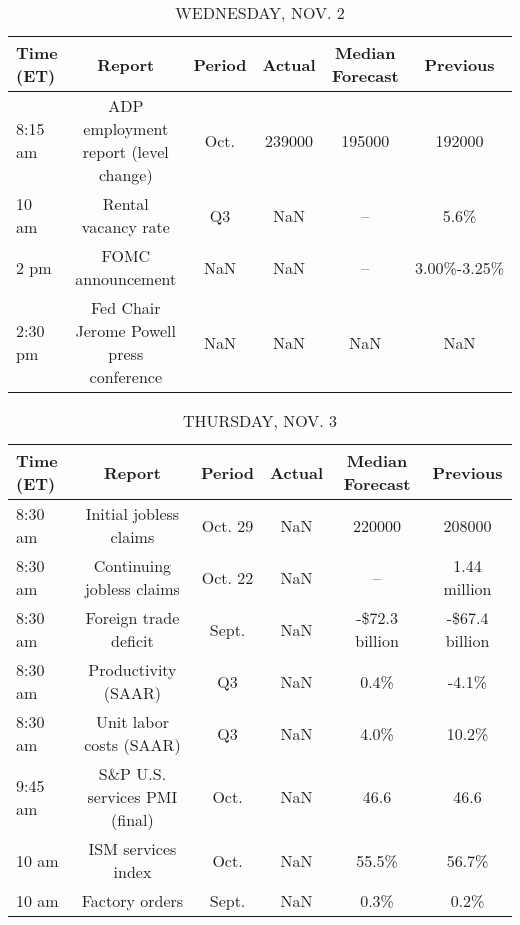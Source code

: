 \documentclass{article}%
\begin{document}
\begin{table}[htbp]%
\caption{WEDNESDAY, NOV. 2}%
\centering%
\begin{adjustbox}{width=1\textwidth}%
\begin{tabular}{lccccc}
\toprule
Time (ET) &                                   Report & Period & Actual & Median Forecast &    Previous \\
\midrule
  8:15 am &     ADP employment report (level change) &   Oct. & 239000 &          195000 &      192000 \\
    10 am &                      Rental vacancy rate &     Q3 &    NaN &              -- &        5.6\% \\
     2 pm &                        FOMC announcement &    NaN &    NaN &              -- & 3.00\%-3.25\% \\
  2:30 pm & Fed Chair Jerome Powell press conference &    NaN &    NaN &             NaN &         NaN \\
\bottomrule
\end{tabular}
%
\end{adjustbox}%
\end{table}

%


\begin{table}[htbp]%
\caption{THURSDAY, NOV. 3}%
\centering%
\begin{adjustbox}{width=1\textwidth}%
\begin{tabular}{lccccc}
\toprule
Time (ET) &                        Report &  Period & Actual & Median Forecast &       Previous \\
\midrule
  8:30 am &        Initial jobless claims & Oct. 29 &    NaN &          220000 &         208000 \\
  8:30 am &     Continuing jobless claims & Oct. 22 &    NaN &              -- &   1.44 million \\
  8:30 am &         Foreign trade deficit &   Sept. &    NaN &  -\$72.3 billion & -\$67.4 billion \\
  8:30 am &           Productivity (SAAR) &      Q3 &    NaN &            0.4\% &          -4.1\% \\
  8:30 am &       Unit labor costs (SAAR) &      Q3 &    NaN &            4.0\% &          10.2\% \\
  9:45 am & S\&P U.S. services PMI (final) &    Oct. &    NaN &            46.6 &           46.6 \\
    10 am &            ISM services index &    Oct. &    NaN &           55.5\% &          56.7\% \\
    10 am &                Factory orders &   Sept. &    NaN &            0.3\% &           0.2\% \\
\bottomrule
\end{tabular}
%
\end{adjustbox}%
\end{table}
\end{document}
